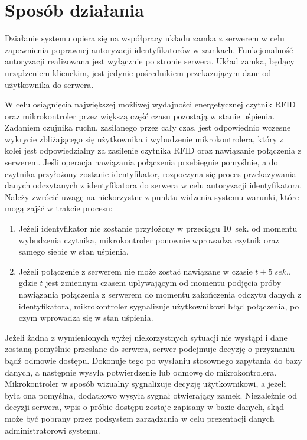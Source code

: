         \section{Sposób działania}
            Działanie systemu opiera się na współpracy układu zamka z serwerem w celu zapewnienia poprawnej autoryzacji identyfikatorów w zamkach. Funkcjonalność autoryzacji realizowana jest wyłącznie po stronie serwera. Układ zamka, będący urządzeniem klienckim, jest jedynie pośrednikiem przekazującym dane od użytkownika do serwera.

            W celu osiągnięcia największej możliwej wydajności energetycznej czytnik RFID oraz mikrokontroler przez większą część czasu pozostają w stanie uśpienia. Zadaniem czujnika ruchu, zasilanego przez cały czas, jest odpowiednio wczesne wykrycie zbliżającego się użytkownika i wybudzenie mikrokontrolera, który z kolei jest odpowiedzialny za zasilenie czytnika RFID oraz nawiązanie połączenia z serwerem. Jeśli operacja nawiązania połączenia przebiegnie pomyślnie, a do czytnika przyłożony zostanie identyfikator, rozpoczyna się proces przekazywania danych odczytanych z identyfikatora do serwera w celu autoryzacji identyfikatora. Należy zwrócić uwagę na niekorzystne z punktu widzenia systemu warunki, które mogą zajść w trakcie procesu:

            \begin{enumerate}
                \item
                    Jeżeli identyfikator nie zostanie przyłożony w przeciągu 10~sek. od momentu wybudzenia czytnika, mikrokontroler ponownie wprowadza czytnik oraz samego siebie w stan uśpienia.
                \item
                    Jeżeli połączenie z serwerem nie może zostać nawiązane w czasie \(t + 5~sek.\), gdzie \(t\) jest zmiennym czasem upływającym od momentu podjęcia próby nawiązania połączenia z serwerem do momentu zakończenia odczytu danych z identyfikatora, mikrokontroler sygnalizuje użytkownikowi błąd połączenia, po czym wprowadza się w stan uśpienia.
            \end{enumerate}

            Jeżeli żadna z wymienionych wyżej niekorzystnych sytuacji nie wystąpi i dane zostaną pomyślnie przesłane do serwera, serwer podejmuje decyzję o przyznaniu bądź odmowie dostępu. Dokonuje tego po wysłaniu stosownego zapytania do bazy danych, a następnie wysyła potwierdzenie lub odmowę do mikrokontrolera. Mikrokontroler w sposób wizualny sygnalizuje decyzję użytkownikowi, a jeżeli była ona pomyślna, dodatkowo wysyła sygnał otwierający zamek. Niezależnie od decyzji serwera, wpis o próbie dostępu zostaje zapisany w bazie danych, skąd może być pobrany przez podsystem zarządzania w celu prezentacji danych administratorowi systemu.

